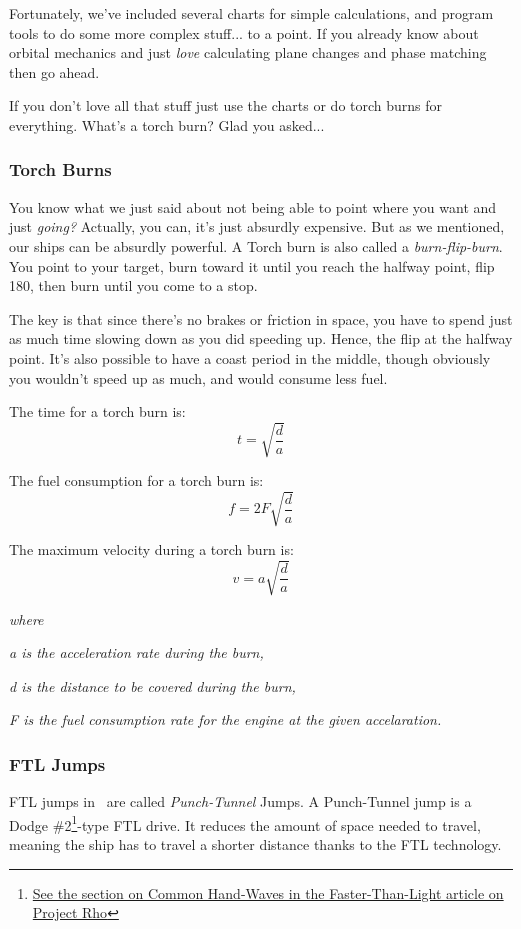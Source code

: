 \par
Fortunately, we've included several charts for simple calculations, and program tools to do some more complex stuff... to a point. If you already know about orbital mechanics and just \textit{love} calculating plane changes and phase matching then go ahead.

\par
If you don't love all that stuff just use the charts or do torch burns for everything. What's a torch burn? Glad you asked...

\subsubsection{Torch Burns}
\par
You know what we just said about not being able to point where you want and just \textit{going?} Actually, you can, it's just absurdly expensive. But as we mentioned, our ships can be absurdly powerful. A Torch burn is also called a \textit{burn-flip-burn}. You point to your target, burn toward it until you reach the halfway point, flip 180\textdegree , then burn until you come to a stop.

\par
The key is that since there's no brakes or friction in space, you have to spend just as much time slowing down as you did speeding up. Hence, the flip at the halfway point. It's also possible to have a coast period in the middle, though obviously you wouldn't speed up as much, and would consume less fuel.

\par
The time for a torch burn is:
\[t = \sqrt{\frac{d}{a}}\]

The fuel consumption for a torch burn is:
\[f = 2F\sqrt{\frac{d}{a}}\]

The maximum velocity during a torch burn is:
\[v = a\sqrt{\frac{d}{a}}\]

\textit{\newline where}
\par\textit{a is the acceleration rate during the burn,}
\par\textit{d is the distance to be covered during the burn,}
\par\textit{F is the fuel consumption rate for the engine at the given accelaration.}

\subsubsection{FTL Jumps}
\par
FTL jumps in \getTitle\, are called \textit{Punch-Tunnel} Jumps. A Punch-Tunnel jump is a Dodge \#2\footnote{\href{http://www.projectrho.com/public_html/rocket/fasterlight.php\#commonhandwaves}{See the section on Common Hand-Waves in the Faster-Than-Light article on Project Rho}}-type FTL drive. It reduces the amount of space needed to travel, meaning the ship has to travel a shorter distance thanks to the FTL technology.

